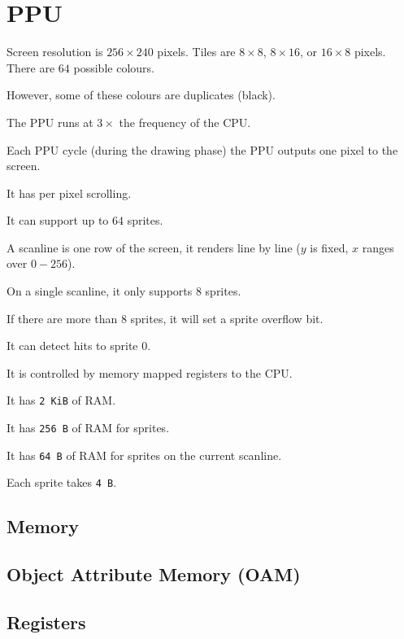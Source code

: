 %

\chapter{PPU}

Screen resolution is $256 \times 240$ pixels.
Tiles are $8 \times 8$, $8 \times 16$, or $16 \times 8$ pixels.
There are $64$ possible colours.

However, some of these colours are duplicates (black).

The PPU runs at $3 \times$ the frequency of the CPU.

Each PPU cycle (during the drawing phase) the PPU outputs one pixel to the
screen.

It has per pixel scrolling.

It can support up to $64$ sprites.

A scanline is one row of the screen, it renders line by line ($y$ is fixed, $x$
ranges over $0-256$).

On a single scanline, it only supports $8$ sprites.

If there are more than $8$ sprites, it will set a sprite overflow bit.

It can detect hits to sprite 0.

It is controlled by memory mapped registers to the CPU.

It has \texttt{2 KiB} of RAM.

It has \texttt{256 B} of RAM for sprites.

It has \texttt{64 B} of RAM for sprites on the current scanline.

Each sprite takes \texttt{4 B}.

\section{Memory}

\section{Object Attribute Memory (OAM)}

\section{Registers}

